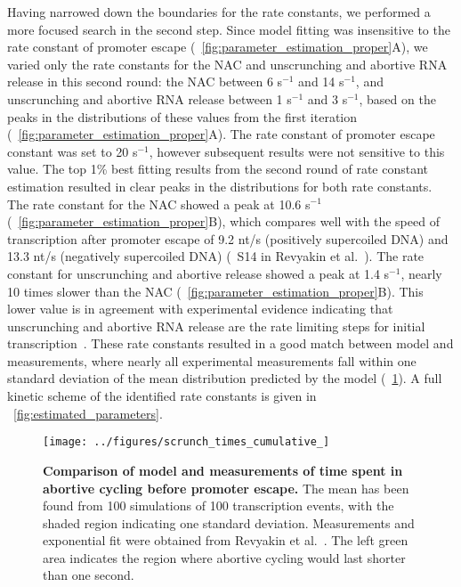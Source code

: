 Having narrowed down the boundaries for the rate constants, we performed a
more focused search in the second step. Since model fitting was insensitive to
the rate constant of promoter escape
(\FIG~\ref{fig:parameter_estimation_proper}A), we varied only the rate
constants for the NAC and unscrunching and abortive RNA release in this second
round: the NAC between 6 s$^{-1}$ and 14 s$^{-1}$, and unscrunching and
abortive RNA release between 1 s$^{-1}$ and 3 s$^{-1}$, based on the peaks in
the distributions of these values from the first iteration
(\FIG~\ref{fig:parameter_estimation_proper}A). The rate constant of promoter
escape constant was set to 20 s$^{-1}$, however subsequent results were not
sensitive to this value. The top 1\% best fitting results from the second
round of rate constant estimation resulted in clear peaks in the distributions
for both rate constants. The rate constant for the NAC showed a peak at 10.6
s$^{-1}$ (\FIG~\ref{fig:parameter_estimation_proper}B), which compares well
with the speed of transcription after promoter escape of 9.2 nt/s (positively
supercoiled DNA) and 13.3 nt/s (negatively supercoiled DNA) (\FIG~S14 in
Revyakin et al.\ \cite{revyakin_abortive_2006}). The rate constant for
unscrunching and abortive release showed a peak at 1.4 s$^{-1}$, nearly 10
times slower than the NAC (\FIG~\ref{fig:parameter_estimation_proper}B). This
lower value is in agreement with experimental evidence indicating that
unscrunching and abortive RNA release are the rate limiting steps for initial
transcription~\cite{revyakin_abortive_2006, margeat_direct_2006}. These rate
constants resulted in a good match between model and measurements, where
nearly all experimental measurements fall within one standard deviation of the
mean distribution predicted by the model (\FIG~\ref{fig:revyakin_fit}). A full
kinetic scheme of the identified rate constants is given in
\FIG~\ref{fig:estimated_parameters}.

\begin{figure}[h]
    \begin{center}
      \texttt{[image: ../figures/scrunch\_times\_cumulative\_]}
    \end{center}
  \caption{{\bf Comparison of model and measurements of time spent in abortive
        cycling before promoter escape.} The mean has been found from 100
        simulations of 100 transcription events, with the shaded region
        indicating one standard deviation. Measurements and exponential fit
        were obtained from Revyakin et al.\ \cite{revyakin_abortive_2006}. The
        left green area indicates the region where abortive cycling would last
        shorter than one second.}
\label{fig:revyakin_fit}
\end{figure}

